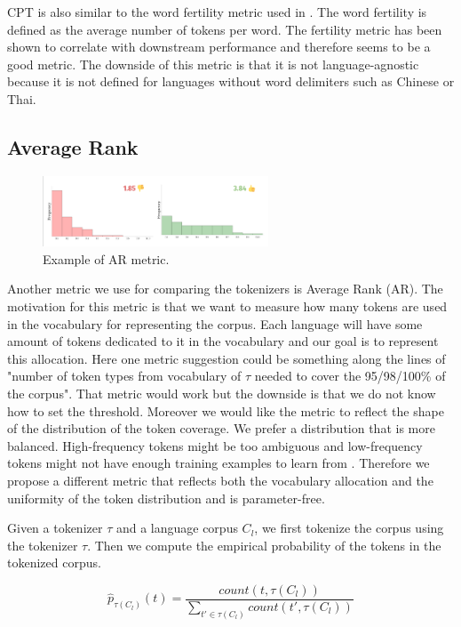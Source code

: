 CPT is also similar to the word fertility metric used in \citet{rust_how_2021}. The word fertility is defined as the average number of tokens per word. The fertility metric has been shown to correlate with downstream performance and therefore seems to be a good metric. The downside of this metric is that it is not language-agnostic because it is not defined for languages without word delimiters such as Chinese or Thai. 

\subsection{Average Rank}

\begin{figure}[h]
    \centering
    \includegraphics[width=0.6\textwidth]{img/temp/ar_example.png}
    \caption{Example of AR metric.}
    \label{fig:ar_example}
\end{figure}

Another metric we use for comparing the tokenizers is Average Rank (AR). The motivation for this metric is that we want to measure how many tokens are used in the vocabulary for representing the corpus. Each language will have some amount of tokens dedicated to it in the vocabulary and our goal is to represent this allocation. Here one metric suggestion could be something along the lines of "number of token types from vocabulary of $\tau$ needed to cover the 95/98/100\% of the corpus". That metric would work but the downside is that we do not know how to set the threshold. Moreover we would like the metric to reflect the shape of the distribution of the token coverage. We prefer a distribution that is more balanced. High-frequency tokens might be too ambiguous and low-frequency tokens might not have enough training examples to learn from \cite{gowda_finding_2020}. Therefore we propose a different metric that reflects both the vocabulary allocation and the uniformity of the token distribution and is parameter-free.

Given a tokenizer $\tau$ and a language corpus $C_l$, we first tokenize the corpus using the tokenizer $\tau$. Then we compute the empirical probability of the tokens in the tokenized corpus.

\begin{equation}
    \hat{p}_{\tau(C_l)}(t) = \frac{count(t, \tau(C_l))}{\sum_{t' \in \tau(C_l)} count(t', \tau(C_l))}
\end{equation}

